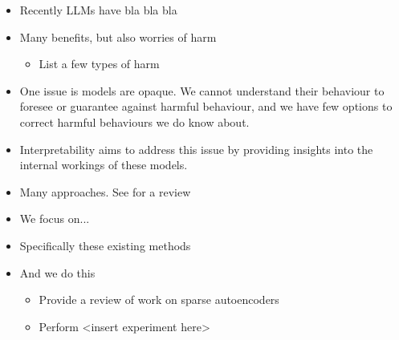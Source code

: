 \documentclass[../main.tex]{subfiles}
\begin{document}
\begin{itemize}
    \item Recently LLMs have bla bla bla
    \item Many benefits, but also worries of harm
    \begin{itemize}
        \item List a few types of harm
    \end{itemize}
    \item One issue is models are opaque. We cannot understand their behaviour to foresee or guarantee against harmful behaviour, and we have few options to correct harmful behaviours we do know about.
    \item Interpretability aims to address this issue by providing insights into the internal workings of these models.
    \item Many approaches. See \citet{bereska_mechanistic_2024} for a review
    \item We focus on...
    \item Specifically these existing methods
    \item And we do this
    \begin{itemize}
        \item Provide a review of work on sparse autoencoders
        \item Perform <insert experiment here>
    \end{itemize}
\end{itemize}

\end{document}
